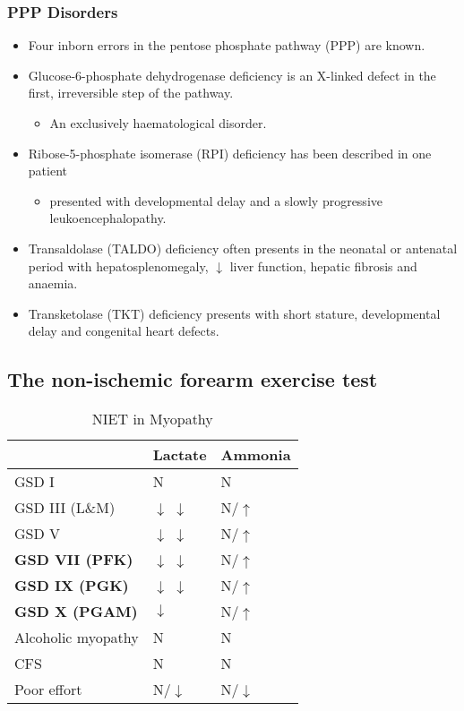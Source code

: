 \documentclass{scrartcl}
\begin{document}
\subsubsection{PPP Disorders}
\label{sec:org74de332}

\begin{itemize}
\item Four inborn errors in the pentose phosphate pathway (PPP) are known.
\item Glucose-6-phosphate dehydrogenase deficiency is an X-linked defect
in the first, irreversible step of the pathway.
\begin{itemize}
\item An exclusively haematological disorder.
\end{itemize}
\item Ribose-5-phosphate isomerase (RPI) deficiency has been described in one patient
\begin{itemize}
\item presented with developmental delay and a slowly progressive leukoencephalopathy.
\end{itemize}
\item Transaldolase (TALDO) deficiency often presents in the neonatal or
antenatal period with hepatosplenomegaly, \(\downarrow\) liver function,
hepatic fibrosis and anaemia.
\item Transketolase (TKT) deficiency presents with short stature,
developmental delay and congenital heart defects.
\end{itemize}

\subsection{The non-ischemic forearm exercise test}
\label{sec:orgf44681a}

\begin{table}[htbp]
\caption{\label{tab:org2d69939}
NIET in Myopathy}
\centering
\begin{tabular}{lll}
 & Lactate & Ammonia\\
\hline
GSD I & N & N\\
GSD III (L\&M) & \(\downarrow\) \(\downarrow\) & N/\(\uparrow\)\\
GSD V & \(\downarrow\) \(\downarrow\) & N/\(\uparrow\)\\
\textbf{GSD VII (PFK)} & \(\downarrow\) \(\downarrow\) & N/\(\uparrow\)\\
\textbf{GSD IX (PGK)} & \(\downarrow\) \(\downarrow\) & N/\(\uparrow\)\\
\textbf{GSD X (PGAM)} & \(\downarrow\) & N/\(\uparrow\)\\
Alcoholic myopathy & N & N\\
CFS & N & N\\
Poor effort & N/\(\downarrow\) & N/\(\downarrow\)\\
\end{tabular}
\end{table}
\end{document}
